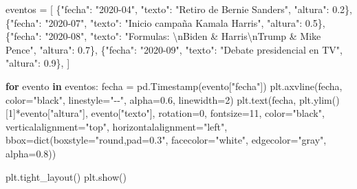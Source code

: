 \documentclass[
  letterpaper,
  DIV=11,
  numbers=noendperiod]{scrartcl}
\newenvironment{Shaded}{\begin{snugshade}}{\end{snugshade}}
\newcommand{\BuiltInTok}[1]{\textcolor[rgb]{0.00,0.23,0.31}{#1}}
\newcommand{\CharTok}[1]{\textcolor[rgb]{0.13,0.47,0.30}{#1}}
\newcommand{\ControlFlowTok}[1]{\textcolor[rgb]{0.00,0.23,0.31}{\textbf{#1}}}
\newcommand{\DecValTok}[1]{\textcolor[rgb]{0.68,0.00,0.00}{#1}}
\newcommand{\FloatTok}[1]{\textcolor[rgb]{0.68,0.00,0.00}{#1}}
\newcommand{\KeywordTok}[1]{\textcolor[rgb]{0.00,0.23,0.31}{\textbf{#1}}}
\newcommand{\NormalTok}[1]{\textcolor[rgb]{0.00,0.23,0.31}{#1}}
\newcommand{\OperatorTok}[1]{\textcolor[rgb]{0.37,0.37,0.37}{#1}}
\newcommand{\StringTok}[1]{\textcolor[rgb]{0.13,0.47,0.30}{#1}}
\begin{document}
\begin{Shaded}
\begin{Highlighting}[]
\NormalTok{eventos }\OperatorTok{=}\NormalTok{ [}
\NormalTok{    \{}\StringTok{"fecha"}\NormalTok{: }\StringTok{"2020{-}04"}\NormalTok{, }\StringTok{"texto"}\NormalTok{: }\StringTok{"Retiro de Bernie Sanders"}\NormalTok{, }\StringTok{"altura"}\NormalTok{: }\FloatTok{0.2}\NormalTok{\},}
\NormalTok{    \{}\StringTok{"fecha"}\NormalTok{: }\StringTok{"2020{-}07"}\NormalTok{, }\StringTok{"texto"}\NormalTok{: }\StringTok{"Inicio campaña Kamala Harris"}\NormalTok{, }\StringTok{"altura"}\NormalTok{: }\FloatTok{0.5}\NormalTok{\},}
\NormalTok{    \{}\StringTok{"fecha"}\NormalTok{: }\StringTok{"2020{-}08"}\NormalTok{, }\StringTok{"texto"}\NormalTok{: }\StringTok{"Formulas: }\CharTok{\textbackslash{}n}\StringTok{Biden \& Harris}\CharTok{\textbackslash{}n}\StringTok{Trump \& Mike Pence"}\NormalTok{, }\StringTok{"altura"}\NormalTok{: }\FloatTok{0.7}\NormalTok{\},}
\NormalTok{    \{}\StringTok{"fecha"}\NormalTok{: }\StringTok{"2020{-}09"}\NormalTok{, }\StringTok{"texto"}\NormalTok{: }\StringTok{"Debate presidencial en TV"}\NormalTok{, }\StringTok{"altura"}\NormalTok{: }\FloatTok{0.9}\NormalTok{\},}
\NormalTok{]}

\ControlFlowTok{for}\NormalTok{ evento }\KeywordTok{in}\NormalTok{ eventos:}
\NormalTok{    fecha }\OperatorTok{=}\NormalTok{ pd.Timestamp(evento[}\StringTok{"fecha"}\NormalTok{])}
\NormalTok{    plt.axvline(fecha, color}\OperatorTok{=}\StringTok{"black"}\NormalTok{, linestyle}\OperatorTok{=}\StringTok{"{-}{-}"}\NormalTok{, alpha}\OperatorTok{=}\FloatTok{0.6}\NormalTok{, linewidth}\OperatorTok{=}\DecValTok{2}\NormalTok{)}
\NormalTok{    plt.text(fecha, plt.ylim()[}\DecValTok{1}\NormalTok{]}\OperatorTok{*}\NormalTok{evento[}\StringTok{"altura"}\NormalTok{], evento[}\StringTok{"texto"}\NormalTok{],}
\NormalTok{             rotation}\OperatorTok{=}\DecValTok{0}\NormalTok{, fontsize}\OperatorTok{=}\DecValTok{11}\NormalTok{, color}\OperatorTok{=}\StringTok{"black"}\NormalTok{,}
\NormalTok{             verticalalignment}\OperatorTok{=}\StringTok{"top"}\NormalTok{, horizontalalignment}\OperatorTok{=}\StringTok{"left"}\NormalTok{,}
\NormalTok{             bbox}\OperatorTok{=}\BuiltInTok{dict}\NormalTok{(boxstyle}\OperatorTok{=}\StringTok{"round,pad=0.3"}\NormalTok{, facecolor}\OperatorTok{=}\StringTok{"white"}\NormalTok{, edgecolor}\OperatorTok{=}\StringTok{"gray"}\NormalTok{, alpha}\OperatorTok{=}\FloatTok{0.8}\NormalTok{))}

\NormalTok{plt.tight\_layout()}
\NormalTok{plt.show()}
\end{Highlighting}
\end{Shaded}
\end{document}
